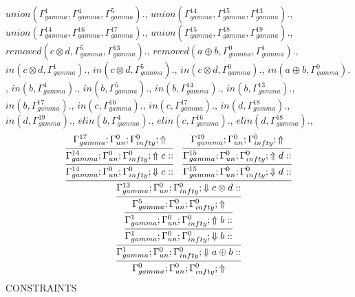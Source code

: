 \documentclass[a4paper, 11pt]{article}
\begin{document}
$union(\Gamma_{gamma}^{1}, \Gamma_{gamma}^{4}, \Gamma_{gamma}^{5}).$, $union(\Gamma_{gamma}^{14}, \Gamma_{gamma}^{15}, \Gamma_{gamma}^{13}).$, $union(\Gamma_{gamma}^{14}, \Gamma_{gamma}^{16}, \Gamma_{gamma}^{17}).$, $union(\Gamma_{gamma}^{15}, \Gamma_{gamma}^{18}, \Gamma_{gamma}^{19}).$, $removed(c \otimes d, \Gamma_{gamma}^{5}, \Gamma_{gamma}^{13}).$, $removed(a \oplus b, \Gamma_{gamma}^{0}, \Gamma_{gamma}^{1}).$, $in(c \otimes d, \Gamma_{gamma}^{1}).$, $in(c \otimes d, \Gamma_{gamma}^{5}).$, $in(c \otimes d, \Gamma_{gamma}^{0}).$, $in(a \oplus b, \Gamma_{gamma}^{0}).$, $in(b, \Gamma_{gamma}^{4}).$, $in(b, \Gamma_{gamma}^{5}).$, $in(b, \Gamma_{gamma}^{14}).$, $in(b, \Gamma_{gamma}^{13}).$, $in(b, \Gamma_{gamma}^{17}).$, $in(c, \Gamma_{gamma}^{16}).$, $in(c, \Gamma_{gamma}^{17}).$, $in(d, \Gamma_{gamma}^{18}).$, $in(d, \Gamma_{gamma}^{19}).$, $elin(b, \Gamma_{gamma}^{4}).$, $elin(c, \Gamma_{gamma}^{16}).$, $elin(d, \Gamma_{gamma}^{18}).$, 
\[
\infer{\Gamma_{ gamma}^{0} ; \Gamma_{un}^{0} ; \Gamma_{ infty}^{0} ;  \Uparrow }
{\infer{\Gamma_{ gamma}^{1} ; \Gamma_{un}^{0} ; \Gamma_{ infty}^{0} ;  \Downarrow a \oplus b :: }
{\infer{\Gamma_{ gamma}^{1} ; \Gamma_{un}^{0} ; \Gamma_{ infty}^{0} ;  \Downarrow b :: }
{\infer{\Gamma_{ gamma}^{1} ; \Gamma_{un}^{0} ; \Gamma_{ infty}^{0} ;  \Uparrow b :: }
{\infer{\Gamma_{ gamma}^{5} ; \Gamma_{un}^{0} ; \Gamma_{ infty}^{0} ;  \Uparrow }
{\infer{\Gamma_{ gamma}^{13} ; \Gamma_{un}^{0} ; \Gamma_{ infty}^{0} ;  \Downarrow c \otimes d :: }
{\infer{\Gamma_{ gamma}^{14} ; \Gamma_{un}^{0} ; \Gamma_{ infty}^{0} ;  \Downarrow c :: }
{\infer{\Gamma_{ gamma}^{14} ; \Gamma_{un}^{0} ; \Gamma_{ infty}^{0} ;  \Uparrow c :: }
{\Gamma_{ gamma}^{17} ; \Gamma_{un}^{0} ; \Gamma_{ infty}^{0} ;  \Uparrow }}
&
\infer{\Gamma_{ gamma}^{15} ; \Gamma_{un}^{0} ; \Gamma_{ infty}^{0} ;  \Downarrow d :: }
{\infer{\Gamma_{ gamma}^{15} ; \Gamma_{un}^{0} ; \Gamma_{ infty}^{0} ;  \Uparrow d :: }
{\Gamma_{ gamma}^{19} ; \Gamma_{un}^{0} ; \Gamma_{ infty}^{0} ;  \Uparrow }}}}}}}}
\]
CONSTRAINTS
\end{document}
